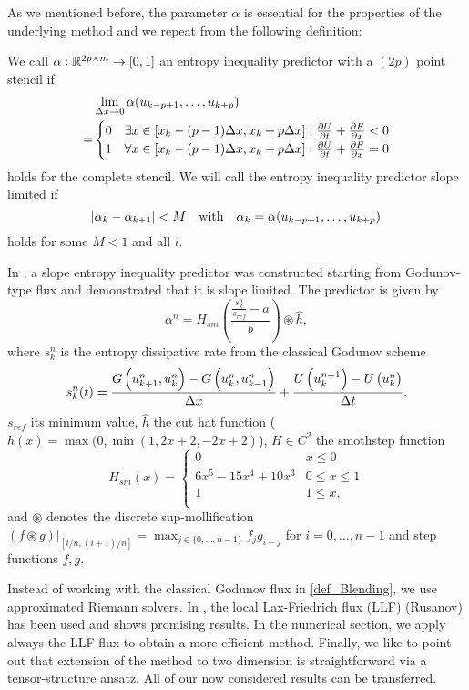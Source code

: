 As we mentioned before, the parameter $\alpha$ is essential for the properties of the underlying method and we repeat from \cite{klein2021using} the following definition:
\begin{definition}
	We call $\alpha: \mathbb{R}^{2p\times m} \to [0, 1]$ an entropy inequality predictor with a $(2p)$ point stencil if
	\begin{align*}
&\lim_{\Delta x \to 0}	\alpha(u_{k-p+1}, \dots, u_{k +p}) \\ = &\begin{cases} 0 &  \exists x \in [x_k -(p-1)\Delta x, x_k + p\Delta x]: \frac{\partial {U} }{\partial {t}} + \frac{\partial {F} }{\partial {x}} < 0\\
	1 & \forall x \in [x_k -(p-1)\Delta x, x_k + p\Delta x]:\frac{\partial {U} }{\partial {t}} + \frac{\partial {F} }{\partial {x}} = 0 \end{cases}
	\end{align*}
	holds for the complete stencil. We will call the entropy inequality predictor slope limited if 
	\[ \abs{\alpha_k - \alpha_{k+1}} < M \quad \text{with} \quad \alpha_k = 	\alpha(u_{k-p+1}, \dots, u_{k+p} )\]
	holds for some $M < 1$ and all $i$.
\end{definition}
In \cite{klein2021using}, a slope entropy inequality predictor was constructed starting from Godunov-type flux and demonstrated  that it is slope limited. The predictor is given by 
	\begin{equation}\label{eq_predictor}
	\alpha^n = H_{sm}\left( \frac{\frac {s^n_k}{s_{ref}} -a}{b}   \right) \circledast \hat{h},
	\end{equation}
where $s^n_k$ is the entropy dissipative rate from the classical Godunov scheme
	\begin{equation*}
		s^n_k(t) = \frac{G\left (u^n_{k+1}, u^n_{k} \right) - G\left (u^n_k, u^n_{k-1} \right)} { \Delta x} + \frac{U\left (u_k^{n+1} \right) - U\left (u^{n}_{k} \right)} { \Delta t}.
	\end{equation*}
 $s_{ref}$ its  minimum value, $\hat{h}$ the cut hat function ($h(x)=\max(0,\min(1,2x+2,-2x+2)$), $H\in C^2$ the smothstep function  
		\begin{equation*}
			H_{sm}(x) = \begin{cases}
				0 & x  \leq 0 \\
				6x^5 - 15x^4+10x^3 & 0 \leq x  \leq 1\\
				1 & 1 \leq x, \\
			\end{cases}
		\end{equation*}
and $\circledast $ denotes the discrete sup-mollification 
$
		(f \circledast g)|_{[i/n, (i+1) / n]} = \max_{j \in \{0, \dots, n-1\}} f_j g_{i-j}$ for $ i = 0, \dots, n-1
$
and step functions $f,g$. 
\begin{remark}
Instead of working with the classical Godunov flux in \cref{def_Blending}, we  use approximated Riemann solvers. In \cite{klein2021using}, the local Lax-Friedrich flux  (LLF) (Rusanov) has been used and shows promising results. In the numerical section, we apply always the LLF flux to obtain a more efficient method. 
Finally, we like to point out that extension of the method to two dimension is straightforward via a tensor-structure ansatz. All of our now considered results can be transferred. 
\end{remark}


